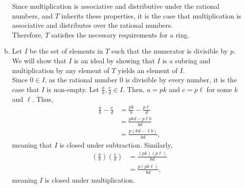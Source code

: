 \documentclass[10pt]{extarticle}
\begin{document}
\begin{enumerate}[(a)]
      Since multiplication is associative and distributive under the rational numbers, and $T$ inherits these properties, it is the case that multiplication is associative and distributes over the rational numbers.\\

      Therefore, $T$ satisfies the necessary requirements for a ring.
    \item Let $I$ be the set of elements in $T$ such that the numerator is divisible by $p$. We will show that $I$ is an ideal by showing that $I$ is a subring and multiplication by any element of $T$ yields an element of $I$.\\

      Since $0\in I$, as the rational number $0$ is divisible by every number, it is the case that $I$ is non-empty. Let $\frac{a}{b},\frac{c}{d}\in I$. Then, $a = pk$ and $c = p\ell$ for some $k$ and $\ell$. Thus,
      \begin{align*}
        \frac{a}{b}-\frac{c}{d} &= \frac{pk}{b} - \frac{p\ell}{d}\\
                                &= \frac{pkd - p\ell b}{bd}\\
                                &= \frac{p(kd - \ell b)}{bd},
      \end{align*}
      meaning that $I$ is closed under subtraction. Similarly,
      \begin{align*}
        \left(\frac{a}{b}\right)\left(\frac{c}{d}\right) &= \frac{(pk)(p\ell)}{bd}\\
                                                         &= \frac{p(pk\ell)}{bd},
      \end{align*}
      meaning $I$ is closed under multiplication.
  \end{enumerate}
\end{document}
